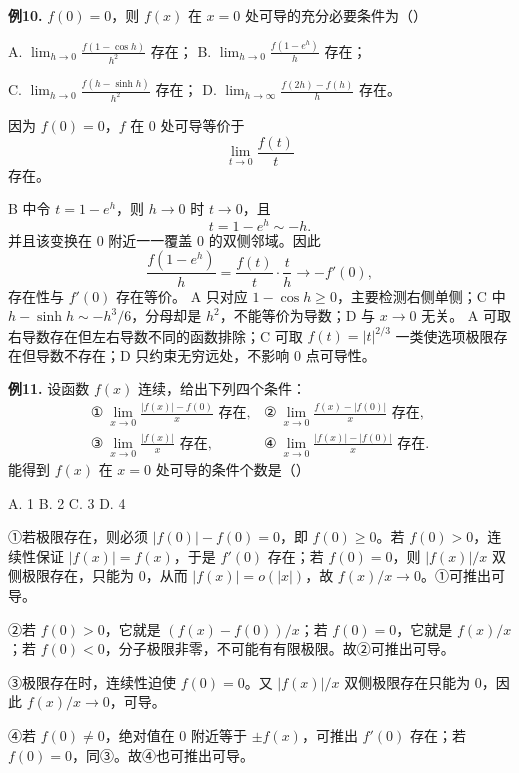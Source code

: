 \begin{problemblock}
\textbf{例10.} \(f(0)=0\)，则 \(f(x)\) 在 \(x=0\) 处可导的充分必要条件为（\quad）

A. \(\displaystyle\lim_{h\to0}\frac{f(1-\cos h)}{h^2}\) 存在；
B. \(\displaystyle\lim_{h\to0}\frac{f(1-e^h)}{h}\) 存在；

C. \(\displaystyle\lim_{h\to0}\frac{f(h-\sinh h)}{h^2}\) 存在；
D. \(\displaystyle\lim_{h\to\infty}\frac{f(2h)-f(h)}h\) 存在。
\end{problemblock}
\begin{solutionblock}
因为 \(f(0)=0\)，\(f\) 在 0 处可导等价于
\[
\lim_{t\to0}\frac{f(t)}t
\]
存在。

B 中令 \(t=1-e^h\)，则 \(h\to0\) 时 \(t\to0\)，且
\[
t=1-e^h\sim-h.
\]
并且该变换在 0 附近一一覆盖 0 的双侧邻域。因此
\[
\frac{f(1-e^h)}h
=\frac{f(t)}t\cdot\frac{t}{h}\to -f'(0),
\]
存在性与 \(f'(0)\) 存在等价。
A 只对应 \(1-\cos h\ge0\)，主要检测右侧单侧；C 中 \(h-\sinh h\sim-h^3/6\)，分母却是 \(h^2\)，不能等价为导数；D 与 \(x\to0\) 无关。
A 可取右导数存在但左右导数不同的函数排除；C 可取 \(f(t)=|t|^{2/3}\) 一类使选项极限存在但导数不存在；D 只约束无穷远处，不影响 0 点可导性。
\end{solutionblock}

\begin{problemblock}
\textbf{例11.} 设函数 \(f(x)\) 连续，给出下列四个条件：
\[
\begin{array}{ll}
①\ \displaystyle\lim_{x\to0}\frac{|f(x)|-f(0)}x\text{ 存在},&
②\ \displaystyle\lim_{x\to0}\frac{f(x)-|f(0)|}x\text{ 存在},\\[2mm]
③\ \displaystyle\lim_{x\to0}\frac{|f(x)|}x\text{ 存在},&
④\ \displaystyle\lim_{x\to0}\frac{|f(x)|-|f(0)|}x\text{ 存在}.
\end{array}
\]
能得到 \(f(x)\) 在 \(x=0\) 处可导的条件个数是（\quad）

A. 1 \qquad B. 2 \qquad C. 3 \qquad D. 4
\end{problemblock}
\begin{solutionblock}
①若极限存在，则必须 \(|f(0)|-f(0)=0\)，即 \(f(0)\ge0\)。若 \(f(0)>0\)，连续性保证 \(|f(x)|=f(x)\)，于是 \(f'(0)\) 存在；若 \(f(0)=0\)，则 \(|f(x)|/x\) 双侧极限存在，只能为 0，从而 \(|f(x)|=o(|x|)\)，故 \(f(x)/x\to0\)。①可推出可导。

②若 \(f(0)>0\)，它就是 \((f(x)-f(0))/x\)；若 \(f(0)=0\)，它就是 \(f(x)/x\)；若 \(f(0)<0\)，分子极限非零，不可能有有限极限。故②可推出可导。

③极限存在时，连续性迫使 \(f(0)=0\)。又 \(|f(x)|/x\) 双侧极限存在只能为 0，因此 \(f(x)/x\to0\)，可导。

④若 \(f(0)\ne0\)，绝对值在 0 附近等于 \(\pm f(x)\)，可推出 \(f'(0)\) 存在；若 \(f(0)=0\)，同③。故④也可推出可导。
\end{solutionblock}

